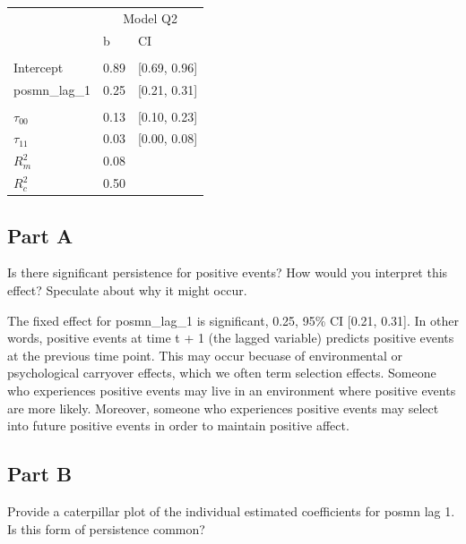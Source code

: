 \documentclass[]{article}
\begin{document}
\begin{table}[H]
\centering
\begin{tabular}{lll}
\toprule
\multicolumn{1}{c}{ } & \multicolumn{2}{c}{Model Q2} \\
\cmidrule(l{2pt}r{2pt}){2-3}
 & b & CI\\
\midrule
\addlinespace[0.3em]
\multicolumn{3}{l}{\textbf{Fixed}}\\
\hspace{1em}Intercept & 0.89 & [0.69, 0.96]\\
\hspace{1em}posmn\_lag\_1 & 0.25 & [0.21, 0.31]\\
\addlinespace[0.3em]
\multicolumn{3}{l}{\textbf{Random}}\\
\hspace{1em}$\tau_{00}$ & 0.13 & [0.10, 0.23]\\
\hspace{1em}$\tau_{11}$ & 0.03 & [0.00, 0.08]\\
$R^2_m$ & 0.08 & \\
$R^2_c$ & 0.50 & \\
\bottomrule
\end{tabular}
\end{table}

\subsection{Part A}\label{part-a-1}

Is there significant persistence for positive events? How would you
interpret this effect? Speculate about why it might occur.

The fixed effect for posmn\_lag\_1 is significant, 0.25, 95\% CI
{[}0.21, 0.31{]}. In other words, positive events at time t + 1 (the
lagged variable) predicts positive events at the previous time point.
This may occur becuase of environmental or psychological carryover
effects, which we often term selection effects. Someone who experiences
positive events may live in an environment where positive events are
more likely. Moreover, someone who experiences positive events may
select into future positive events in order to maintain positive affect.

\subsection{Part B}\label{part-b-1}

Provide a caterpillar plot of the individual estimated coefficients for
posmn lag 1. Is this form of persistence common?
\end{document}
